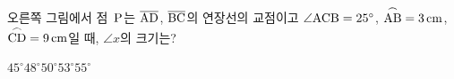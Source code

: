 \noindent\begin{minipage}[t]{0.58\linewidth}\vspace{0pt}\raggedright 오른쪽 그림에서 점~$\mathrm{P}$는 $\overline{\mathrm{AD}}$, $\overline{\mathrm{BC}}$의 연장선의 교점이고 $\angle\mathrm{ACB}=25^\circ$, $\overset{\frown}{\mathrm{AB}}=3\,\mathrm{cm}$, $\overset{\frown}{\mathrm{CD}}=9\,\mathrm{cm}$일 때, $\angle x$의 크기는?\end{minipage}\hfill\begin{minipage}[t]{0.4\linewidth}\vspace{0pt}\centering \resizebox{\ifdim\width>\linewidth\linewidth\else\width\fi}{!}{}\end{minipage}\par
\begin{choices32}{$45^\circ$}{$48^\circ$}{$50^\circ$}{$53^\circ$}{$55^\circ$}\end{choices32}
